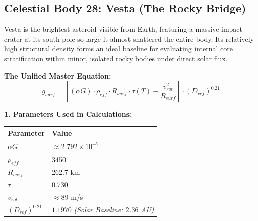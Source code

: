 \documentclass[11pt, a4paper]{article}
\begin{document}
\clearpage
\subsection{Celestial Body 28: Vesta (The Rocky Bridge)}
  Vesta is the brightest asteroid visible from Earth, featuring a massive impact crater at its south pole so large it almost shattered the entire body. Its relatively high structural density forms an ideal baseline for evaluating internal core stratification within minor, isolated rocky bodies under direct solar flux.

  \vspace{0.5em}
  \noindent \textbf{The Unified Master Equation:}
  $$ g_{surf} = \left[ (\alpha G) \cdot \rho_{eff} \cdot R_{surf} \cdot \tau(T) - \frac{v_{rot}^2}{R_{surf}} \right] \cdot (D_{ref})^{0.21} $$

  \vspace{0.5em}
  \noindent \textbf{1. Parameters Used in Calculations:} \\[0.5em]
  \begingroup
  \renewcommand{\arraystretch}{1.3}
  \hspace*{2em}
  \begin{tabular}{|l|l|}
    \hline
    \textbf{Parameter} & \textbf{Value} \\ \hline
    $\alpha G$ & $\approx 2.792 \times 10^{-7}$ \\ \hline
    $\rho_{eff}$ & 3450 \\ \hline
    $R_{surf}$ & 262.7 km \\ \hline
    $\tau$ & 0.730 \\ \hline
    $v_{rot}$ & $\approx 89$ m/s \\ \hline
    $(D_{ref})^{0.21}$ & $1.1970$ \textit{(Solar Baseline: $2.36$ AU)} \\ \hline
  \end{tabular}
  \endgroup
\end{document}
